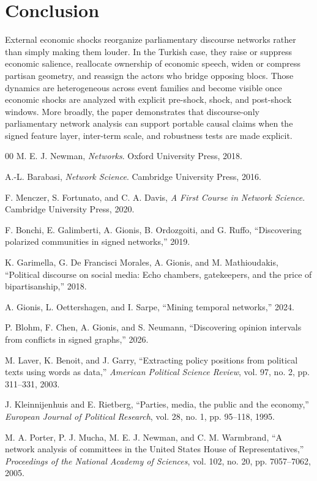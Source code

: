 \documentclass[conference]{IEEEtran}
\begin{document}
\smallskip
\section{Conclusion}
External economic shocks reorganize parliamentary discourse networks rather than simply making them louder. In the Turkish case, they raise or suppress economic salience, reallocate ownership of economic speech, widen or compress partisan geometry, and reassign the actors who bridge opposing blocs. Those dynamics are heterogeneous across event families and become visible once economic shocks are analyzed with explicit pre-shock, shock, and post-shock windows. More broadly, the paper demonstrates that discourse-only parliamentary network analysis can support portable causal claims when the signed feature layer, inter-term scale, and robustness tests are made explicit.

\begin{thebibliography}{00}
M. E. J. Newman, \emph{Networks}. Oxford University Press, 2018.

A.-L. Barabasi, \emph{Network Science}. Cambridge University Press, 2016.

F. Menczer, S. Fortunato, and C. A. Davis, \emph{A First Course in Network Science}. Cambridge University Press, 2020.

F. Bonchi, E. Galimberti, A. Gionis, B. Ordozgoiti, and G. Ruffo, ``Discovering polarized communities in signed networks,'' 2019.

K. Garimella, G. De Francisci Morales, A. Gionis, and M. Mathioudakis, ``Political discourse on social media: Echo chambers, gatekeepers, and the price of bipartisanship,'' 2018.

A. Gionis, L. Oettershagen, and I. Sarpe, ``Mining temporal networks,'' 2024.

P. Blohm, F. Chen, A. Gionis, and S. Neumann, ``Discovering opinion intervals from conflicts in signed graphs,'' 2026.

M. Laver, K. Benoit, and J. Garry, ``Extracting policy positions from political texts using words as data,'' \emph{American Political Science Review}, vol. 97, no. 2, pp. 311--331, 2003.

J. Kleinnijenhuis and E. Rietberg, ``Parties, media, the public and the economy,'' \emph{European Journal of Political Research}, vol. 28, no. 1, pp. 95--118, 1995.

M. A. Porter, P. J. Mucha, M. E. J. Newman, and C. M. Warmbrand, ``A network analysis of committees in the United States House of Representatives,'' \emph{Proceedings of the National Academy of Sciences}, vol. 102, no. 20, pp. 7057--7062, 2005.
\end{thebibliography}
\end{document}
